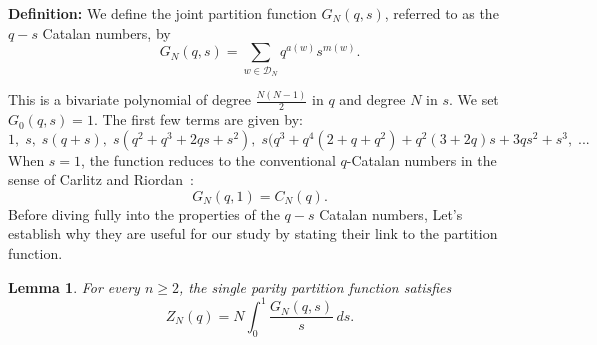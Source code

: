 \documentclass[pdflatex,sn-mathphys-num]{sn-jnl}
\newtheorem{lemma}[theorem]{Lemma}
\theoremstyle{definition}
\theoremstyle{remark}
\numberwithin{equation}{section}
\begin{document}
\noindent
\textbf{Definition:}
We define the joint partition function $G_N(q,s)$, referred to as the $q\!-\!s$ Catalan numbers, by
\begin{equation}
  G_N(q,s) = \sum_{w \in \mathcal{D}_N} q^{a(w)} s^{m(w)}.
\end{equation}

This is a bivariate polynomial of degree $\frac{N(N-1)}{2}$ in $q$ and degree $N$ in $s$. We set $G_0(q,s) = 1$. The first few terms are given by:
$$
1, \; s, \; s (q + s), \; s (q^2 + q^3 + 2 q s + s^2), \; s (q^3 + 
   q^4 (2 + q + q^2) + q^2 (3 + 2 q) s + 3 q s^2 + s^3, \; ...
$$
When $s = 1$, the function reduces to the conventional $q$-Catalan numbers in the sense of Carlitz and Riordan~\cite{CarlitzRiordan1964}:
\begin{equation}
  G_N(q,1) = C_N(q).
\end{equation}
Before diving fully into the properties of the $q\!-\!s$ Catalan numbers, 
Let's establish why they are useful for our study by stating their link to the partition function.










\begin{lemma}
\label{lemma_two}
For every $n\ge 2$, the single parity partition function satisfies
\begin{equation}
Z_N(q)=N\int_{0}^{1}\frac{G_N(q,s)}{s}\,ds .
\label{Z_in_terms_of_G}
\end{equation}
\end{lemma}
\end{document}
